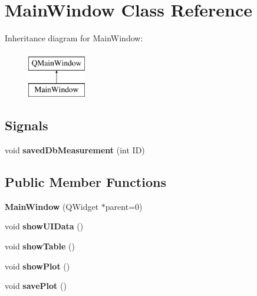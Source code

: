 \hypertarget{classMainWindow}{\section{Main\-Window Class Reference}
\label{classMainWindow}
}
Inheritance diagram for Main\-Window\-:\begin{figure}[H]
\begin{center}
\leavevmode
\includegraphics[height=2.000000cm]{classMainWindow}
\end{center}
\end{figure}
\subsection*{Signals}
\begin{DoxyCompactItemize}
\item 
\hypertarget{classMainWindow_a9bae38f96fcaedf7125b6264f289997a}{void {\bfseries saved\-Db\-Measurement} (int I\-D)}\label{classMainWindow_a9bae38f96fcaedf7125b6264f289997a}

\end{DoxyCompactItemize}
\subsection*{Public Member Functions}
\begin{DoxyCompactItemize}
\item 
\hypertarget{classMainWindow_a8b244be8b7b7db1b08de2a2acb9409db}{{\bfseries Main\-Window} (Q\-Widget $\ast$parent=0)}\label{classMainWindow_a8b244be8b7b7db1b08de2a2acb9409db}

\item 
\hypertarget{classMainWindow_a0392dad1c5a2be0720a06c1d7a5f5323}{void {\bfseries show\-U\-I\-Data} ()}\label{classMainWindow_a0392dad1c5a2be0720a06c1d7a5f5323}

\item 
\hypertarget{classMainWindow_afc1a58cf1884228025fc356943333c1b}{void {\bfseries show\-Table} ()}\label{classMainWindow_afc1a58cf1884228025fc356943333c1b}

\item 
\hypertarget{classMainWindow_a174a97382f475227fdf27c22b407e890}{void {\bfseries show\-Plot} ()}\label{classMainWindow_a174a97382f475227fdf27c22b407e890}

\item 
\hypertarget{classMainWindow_a15b3fb06da036220ff52460053ef5f9f}{void {\bfseries save\-Plot} ()}\label{classMainWindow_a15b3fb06da036220ff52460053ef5f9f}

\end{DoxyCompactItemize}
